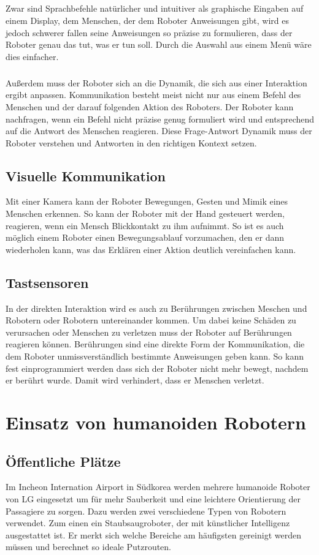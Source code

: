 \subparagraph{}
Zwar sind Sprachbefehle natürlicher und intuitiver als graphische Eingaben auf
einem Display, dem Menschen, der dem Roboter Anweisungen gibt, wird es jedoch
schwerer fallen seine Anweisungen so präzise zu formulieren, dass der Roboter
genau das tut, was er tun soll. Durch die Auswahl aus einem Menü wäre dies
einfacher.

\subparagraph{}
Außerdem muss der Roboter sich an die Dynamik, die sich aus einer Interaktion
ergibt anpassen. Kommunikation besteht meist nicht nur aus einem Befehl des
Menschen und der darauf folgenden Aktion des Roboters. Der Roboter kann
nachfragen, wenn ein Befehl nicht präzise genug formuliert wird und entsprechend
auf die Antwort des Menschen reagieren. Diese Frage-Antwort Dynamik muss der
Roboter verstehen und Antworten in den richtigen Kontext setzen.

\subsection{Visuelle Kommunikation}
Mit einer Kamera kann der Roboter Bewegungen, Gesten und Mimik eines Menschen
erkennen. So kann der Roboter mit der Hand gesteuert werden, reagieren, wenn ein
Mensch Blickkontakt zu ihm aufnimmt. So ist es auch möglich einem Roboter einen
Bewegungsablauf vorzumachen, den er dann wiederholen kann, was das Erklären
einer Aktion deutlich vereinfachen kann.

\subsection{Tastsensoren}
In der direkten Interaktion wird es auch zu
Berührungen zwischen Meschen und Robotern oder Robotern untereinander kommen. Um
dabei keine Schäden zu verursachen oder Menschen zu verletzen muss der Roboter
auf Berührungen reagieren können. Berührungen sind eine direkte Form der
Kommunikation, die dem Roboter unmissverständlich bestimmte Anweisungen geben
kann. So kann fest einprogrammiert werden dass sich der Roboter nicht mehr
bewegt, nachdem er berührt wurde. Damit wird verhindert, dass er Menschen
verletzt. \cite{Prassler2004}

\section{Einsatz von humanoiden Robotern}\label{sec:einsatz}
\subsection{Öffentliche Plätze}\label{sec:oeffentliche-plaetze}
Im Incheon Internation Airport in Südkorea werden mehrere humanoide Roboter von
LG eingesetzt um für mehr Sauberkeit und eine leichtere Orientierung der
Passagiere zu sorgen. Dazu werden zwei verschiedene Typen von Robotern
verwendet. Zum einen ein Staubsaugroboter, der mit künstlicher Intelligenz
ausgestattet ist. Er merkt sich welche Bereiche am häufigsten gereinigt werden
müssen und berechnet so ideale Putzrouten.

